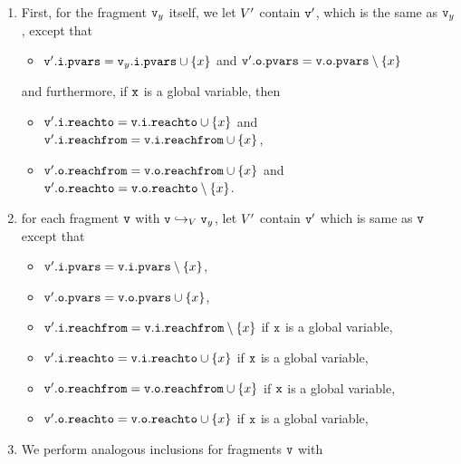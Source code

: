 \begin{enumerate}
  \item
First, for the fragment $\mathtt{v}_y$ itself, we let $V'$ contain
$\mathtt{v}'$, which is the same as $\mathtt{v}_y$, except that
\begin{itemize}
\item $\mathtt{v}'.\mathtt{i}.\mathtt{pvars} = \mathtt{v}_y.\mathtt{i}.\mathtt{pvars} \cup \left\{x\right\}$ and
  $\mathtt{v}'.\mathtt{o}.\mathtt{pvars} = \mathtt{v}.\mathtt{o}.\mathtt{pvars} \setminus \left\{x\right\}$
\end{itemize}
and furthermore, if $\mathtt{x}$ is a global variable, then
\begin{itemize}
\item $\mathtt{v}'.\mathtt{i}.\mathtt{reachto} = \mathtt{v}.\mathtt{i}.\mathtt{reachto} \cup \left\{x\right\}$ and
$\mathtt{v}'.\mathtt{i}.\mathtt{reachfrom} = \mathtt{v}.\mathtt{i}.\mathtt{reachfrom} \cup \left\{x\right\}$,
\item $\mathtt{v}'.\mathtt{o}.\mathtt{reachfrom} = \mathtt{v}.\mathtt{o}.\mathtt{reachfrom} \cup \left\{x\right\}$ and
$\mathtt{v}'.\mathtt{o}.\mathtt{reachto} = \mathtt{v}.\mathtt{o}.\mathtt{reachto} \setminus \left\{x\right\}$.
\end{itemize}
\item  for each fragment $\mathtt{v}$ with $\mathtt{v} \hookrightarrow_{V} \mathtt{v}_y$, let $V'$ contain $\mathtt{v}'$ which is same as $\mathtt{v}$ except that
\begin{itemize}
\item $\mathtt{v}'.\mathtt{i}.\mathtt{pvars} = \mathtt{v}.\mathtt{i}.\mathtt{pvars} \setminus \left\{x\right\}$,
\item $\mathtt{v}'.\mathtt{o}.\mathtt{pvars} = \mathtt{v}.\mathtt{o}.\mathtt{pvars} \cup \left\{x\right\}$,
\item $\mathtt{v}'.\mathtt{i}.\mathtt{reachfrom} = \mathtt{v}.\mathtt{i}.\mathtt{reachfrom} \setminus \left\{x\right\}$ if $\tt x$ is a global variable,
\item $\mathtt{v}'.\mathtt{i}.\mathtt{reachto} = \mathtt{v}.\mathtt{i}.\mathtt{reachto} \cup \left\{x\right\}$ if $\tt x$ is a global variable,
 \item $\mathtt{v}'.\mathtt{o}.\mathtt{reachfrom} = \mathtt{v}.\mathtt{o}.\mathtt{reachfrom} \cup \left\{x\right\}$ if $\tt x$ is a global variable,
\item $\mathtt{v}'.\mathtt{o}.\mathtt{reachto} = \mathtt{v}.\mathtt{o}.\mathtt{reachto} \cup \left\{x\right\}$ if $\tt x$ is a global variable,
\end{itemize}
\item We perform analogous inclusions for fragments $\mathtt{v}$ with

\end{enumerate}
